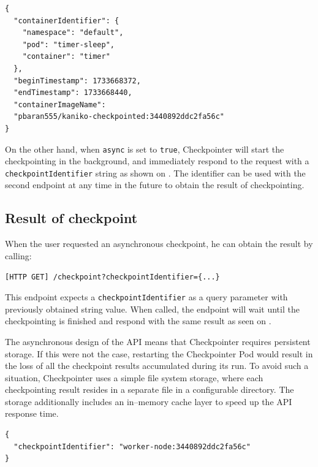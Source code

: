 \documentclass[
  digital,     %
  oneside,     %
  nosansbold,  %
  nocolorbold, %
  lof,         %
  nolot,         %
]{fithesis4}
\newenvironment{code}{\captionsetup{type=listing}}{}
\begin{document}
\begin{code}
\label{lst:checkpoint:response}
\begin{verbatim}
{
  "containerIdentifier": {
    "namespace": "default",
    "pod": "timer-sleep",
    "container": "timer"
  },
  "beginTimestamp": 1733668372,
  "endTimestamp": 1733668440,
  "containerImageName":
  "pbaran555/kaniko-checkpointed:3440892ddc2fa56c"
}
\end{verbatim}
\end{code}

On the other hand, when \texttt{async} is set to \texttt{true}, Checkpointer will start the checkpointing in the background, and immediately respond to the request with a \texttt{checkpointIdentifier} string as shown on . The identifier can be used with the second endpoint at any time in the future to obtain the result of checkpointing.


\subsection{Result of checkpoint}
When the user requested an asynchronous checkpoint, he can obtain the result by calling:
\begin{description}
  \item \texttt{[HTTP GET] /checkpoint?checkpointIdentifier=\{...\}}
\end{description}
This endpoint expects a \texttt{checkpointIdentifier} as a query parameter with previously obtained string value. When called, the endpoint will wait until the checkpointing is finished and respond with the same result as seen on .


The asynchronous design of the API means that Checkpointer requires persistent storage. If this were not the case, restarting the Checkpointer Pod would result in the loss of all the checkpoint results accumulated during its run. To avoid such a situation, Checkpointer uses a simple file system storage, where each checkpointing result resides in a separate file in a configurable directory. The storage additionally includes an in--memory cache layer to speed up the API response time.

\begin{code}
\label{lst:checkpoint:response:async}
\begin{verbatim}
{
  "checkpointIdentifier": "worker-node:3440892ddc2fa56c"
}
\end{verbatim}
\end{code}
\end{document}
